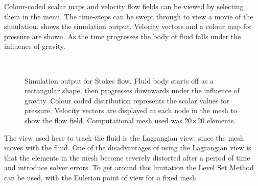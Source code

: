 %
Colour-coded scalar maps and velocity flow fields can be viewed by selecting
them in the menu.
The time-steps can be swept through to view a movie of the simulation.
 shows the simulation output.
Velocity vectors and a colour map for pressure are shown.
As the time progresses the body of fluid falls under the influence of gravity.
%
\begin{figure}[ht]
\center
{}
\hspace{1.6cm}
\hspace{1.6cm}
\\
\hspace{1cm}
\hspace{1cm}
\caption{Simulation output for Stokes flow. Fluid body starts off as a
rectangular shape, then progresses downwards under the influence of gravity.
Colour coded distribution represents the scalar values for pressure.
Velocity vectors are displayed at each node in the mesh to show the flow field.
Computational mesh used was 20$\times$20 elements.}
\label{FLUID OUTPUT}
\end{figure}
%
The view used here to track the fluid is the Lagrangian view, since the mesh
moves with the fluid. One of the disadvantages of using the Lagrangian view is
that the elements in the mesh become severely distorted after a period of time
and introduce solver errors. To get around this limitation the Level Set
Method can be used, with the Eulerian point of view for a fixed mesh.

